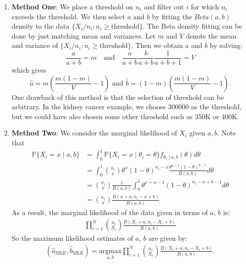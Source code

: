 \documentclass{scrartcl}
\renewcommand{\P}{{\mathbb P}}
\begin{document}
\begin{enumerate}
\item \textbf{Method One}: We place a threshold on $n_i$ and filter out
  $i$ for which $n_i$ exceeds the threshold. We then select $a$ and
  $b$ by fitting the $Beta(a, b)$ density to the data $\{X_i/n_i : n_i
  \geq \text{threshold}\}$. The Beta density fitting can be done by
  just matching mean and variances. Let $m$ and $V$ denote the mean
  and variance of $\{X_i/n_i : n_i
  \geq \text{threshold}\}$. Then we obtain $a$ and $b$ by solving:
  \begin{equation*}
    \frac{a}{a+b} = m ~~~ \text{ and } ~~~ \frac{a}{a+b} \frac{b}{a+b}
    \frac{1}{a+b+1} = V
  \end{equation*}
  which gives
  \begin{equation*}
    \hat{a} = m \left(\frac{m(1-m)}{V} - 1 \right) \text{ and } \hat{b} = (1
    - m) \left(\frac{m(1-m)}{V} - 1 \right). 
  \end{equation*}
  One drawback of this method is that the selection of threshold can
  be arbitrary. In the kidney cancer example, we choose 300000 as the
  threshold, but we could have also chosen some other threshold such
  as 350K or 400K.
\item \textbf{Method Two}: We consider the marginal likelihood of
  $X_i$ given $a, b$. Note that
  \begin{align*}
    \P \{X_i = x \mid a, b\} &= \int_0^1  \P\{X_i = x \mid \theta_i = \theta\}
                               f_{\theta_i \mid a, b}(\theta) d\theta
    \\
    &= \int_0^1 {n_i \choose x} \theta^x (1 - \theta)^{n_i - x}
      \frac{\theta^{a-1} (1 - \theta)^{b-1}}{B(a, b)} d\theta \\
    &={n_i \choose x} \frac{1}{B(a, b)} \int_0^1 \theta^{x + a - 1} (1 -
      \theta)^{n_i - x + b - 1} d\theta \\ &= {n_i \choose x} \frac{B(x + a,
      n_i - x + b)}{B(a, b)}
  \end{align*}
  As a result, the marginal likelihood of the data  given  in terms of
  $a$, $b$ is:
  \begin{align*}
    \prod_{i=1}^N {n_i \choose X_i} \frac{B(X_i + a,
      n_i - X_i + b)}{B(a, b)}
  \end{align*}
  So the maximum likelihood estimates of $a$, $b$ are given by:
  \begin{align*}
    (\hat{a}_{\text{MLE}}, \hat{b}_{\text{MLE}}) = \underset{a,
    b}{\text{argmax}} \prod_{i=1}^N {n_i 
    \choose X_i} \frac{B(X_i + a, n_i - X_i + b)}{B(a, b)}.  

\end{align*}
\end{enumerate}
\end{document}
